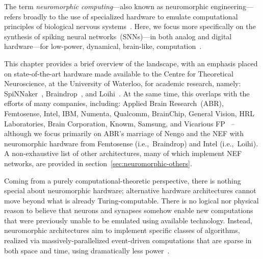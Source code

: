 The term \emph{neuromorphic computing}---also known as neuromorphic engineering---refers broadly to the use of specialized hardware to emulate computational principles of biological nervous systems~\citep{mead1989analog, liu2002analog}.
Here, we focus more specifically on the synthesis of spiking neural networks~(SNNs)---in both analog and digital hardware---for low-power, dynamical, brain-like, computation~\citep{boahen2017neuromorph}.

This chapter provides a brief overview of the landscape, with an emphasis placed on state-of-the-art hardware made available to the Centre for Theoretical Neuroscience, at the University of Waterloo, for academic research, namely: SpiNNaker~\citep{furber2014spinnaker}, Braindrop~\citep{braindrop2019}, and Loihi~\citep{davies2018loihi}.
At the same time, this overlaps with the efforts of many companies, including: Applied Brain Research~(ABR), Femtosense, Intel, IBM, Numenta, Qualcomm, BrainChip, General Vision, HRL Laboratories, Brain Corporation, Knowm, Samsung, and Vicarious FP~\citep{marketreport2018, femtosense} -- although we focus primarily on ABR's marriage of Nengo and the NEF with neuromorphic hardware from Femtosense (i.e.,~Braindrop) and Intel (i.e.,~Loihi).
A non-exhaustive list of other architectures, many of which implement NEF networks, are provided in section~\ref{sec:neuromorphic-others}.

Coming from a purely computational-theoretic perspective, there is nothing special about neuromorphic hardware; alternative hardware architectures cannot move beyond what is already Turing-computable.
There is no logical nor physical reason to believe that neurons and synapses somehow enable new computations that were previously unable to be emulated using available technology.
Instead, neuromorphic architectures aim to implement specific classes of algorithms, realized via massively-parallelized event-driven computations that are sparse in both space and time, using dramatically less power~\citep{tang2017sparse}.

